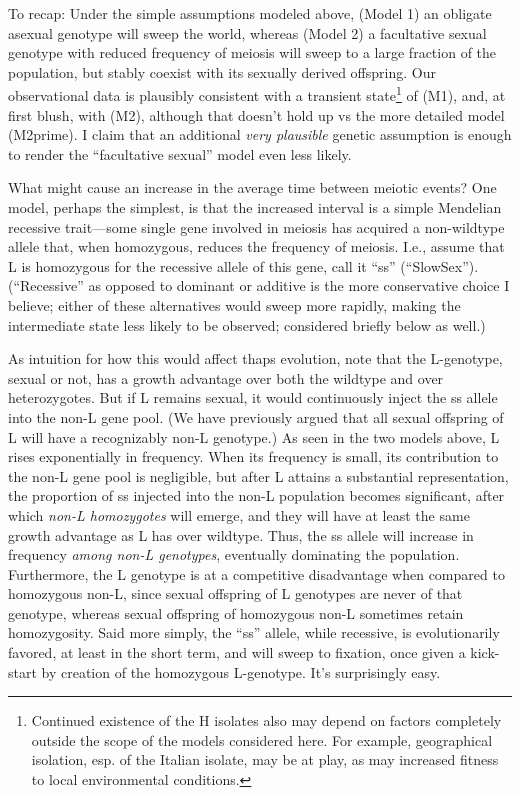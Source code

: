 \documentclass{article}\usepackage[]{graphicx}\usepackage[]{color}
\begin{document}
To recap: Under the simple assumptions modeled above, (Model 1) an obligate asexual genotype will
sweep the world, whereas (Model 2) a facultative sexual genotype with reduced frequency of meiosis
will sweep to a large fraction of the population, but stably coexist with its sexually derived
offspring.  Our observational data is plausibly consistent with a transient state\footnote
{ 
  Continued existence of the H isolates also may depend on factors completely 
  outside the scope of the models considered here.  For example, geographical isolation, 
  esp. of the Italian isolate, may be at play, as may increased fitness to local 
  environmental conditions.
}
of (M1), and, at first blush, with (M2), although that doesn't hold up vs the more detailed model
(M2prime).  I claim that an additional \textit{very plausible} genetic assumption is enough to
render the ``facultative sexual'' model even less likely.

What might cause an increase in the average time between meiotic events?  One model, perhaps the
simplest, is that the increased interval is a simple Mendelian recessive trait---some single gene
involved in meiosis has acquired a non-wildtype allele that, when homozygous, reduces the frequency
of meiosis.  I.e., assume that L is homozygous for the recessive allele of this gene, call it ``ss''
(``SlowSex'').  (``Recessive'' as opposed to dominant or additive is the more conservative choice I
believe; either of these alternatives would sweep more rapidly, making the intermediate state less
likely to be observed; considered briefly below as well.)

As intuition for how this would affect thaps evolution, note that the L-genotype, sexual or not, has
a growth advantage over both the wildtype and over heterozygotes.  But if L remains sexual, it would
continuously inject the ss allele into the non-L gene pool.  (We have previously argued that all
sexual offspring of L will have a recognizably non-L genotype.)  As seen in the two models above, L
rises exponentially in frequency.  When its frequency is small, its contribution to the non-L gene
pool is negligible, but after L attains a substantial representation, the proportion of ss injected
into the non-L population becomes significant, after which \textit{non-L homozygotes} will emerge,
and they will have at least the same growth advantage as L has over wildtype.  Thus, the ss allele
will increase in frequency \textit{among non-L genotypes}, eventually dominating the population.
Furthermore, the L genotype is at a competitive disadvantage when compared to homozygous non-L,
since sexual offspring of L genotypes are never of that genotype, whereas sexual offspring of
homozygous non-L sometimes retain homozygosity. Said more simply, the ``ss'' allele, while
recessive, is evolutionarily favored, at least in the short term, and will sweep to fixation, once
given a kick-start by creation of the homozygous L-genotype.  It's surprisingly easy.
\end{document}
